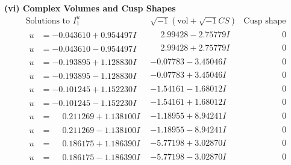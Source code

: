\documentclass[1p]{elsarticle_modified}
\theoremstyle{definition}
\newcommand{\I}{\sqrt{-1}}
\begin{document}
\newpage\flushleft \textbf{(vi) Complex Volumes and Cusp Shapes}
$$\begin{array}{c|c|c}  
\text{Solutions to }I^u_{1}& \I (\text{vol} + \sqrt{-1}CS) & \text{Cusp shape}\\
 \hline 
\begin{aligned}
u &= -0.043610 + 0.954497 I\end{aligned}
 & \phantom{-}2.99428 - 2.75779 I & \phantom{-0.000000 } 0 \\ \hline\begin{aligned}
u &= -0.043610 - 0.954497 I\end{aligned}
 & \phantom{-}2.99428 + 2.75779 I & \phantom{-0.000000 } 0 \\ \hline\begin{aligned}
u &= -0.193895 + 1.128830 I\end{aligned}
 & -0.07783 - 3.45046 I & \phantom{-0.000000 } 0 \\ \hline\begin{aligned}
u &= -0.193895 - 1.128830 I\end{aligned}
 & -0.07783 + 3.45046 I & \phantom{-0.000000 } 0 \\ \hline\begin{aligned}
u &= -0.101245 + 1.152230 I\end{aligned}
 & -1.54161 - 1.68012 I & \phantom{-0.000000 } 0 \\ \hline\begin{aligned}
u &= -0.101245 - 1.152230 I\end{aligned}
 & -1.54161 + 1.68012 I & \phantom{-0.000000 } 0 \\ \hline\begin{aligned}
u &= \phantom{-}0.211269 + 1.138100 I\end{aligned}
 & -1.18955 + 8.94241 I & \phantom{-0.000000 } 0 \\ \hline\begin{aligned}
u &= \phantom{-}0.211269 - 1.138100 I\end{aligned}
 & -1.18955 - 8.94241 I & \phantom{-0.000000 } 0 \\ \hline\begin{aligned}
u &= \phantom{-}0.186175 + 1.186390 I\end{aligned}
 & -5.77198 + 3.02870 I & \phantom{-0.000000 } 0 \\ \hline\begin{aligned}
u &= \phantom{-}0.186175 - 1.186390 I\end{aligned}
 & -5.77198 - 3.02870 I & \phantom{-0.000000 } 0 \\ \hline\begin{aligned}

\end{aligned}
\end{array}$$
\end{document}
